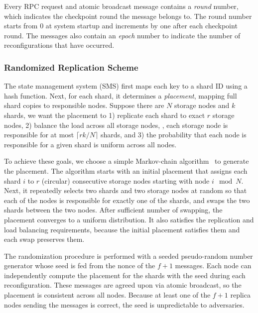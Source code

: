 Every RPC request and atomic broadcast message contains a \emph{round} number, which indicates the checkpoint round the message belongs to.
The round number starts from 0 at system startup and increments by one after each checkpoint round.
The \voter messages also contain an \emph{epoch} number to indicate the number of reconfigurations that have occurred.

\subsubsection{Randomized Replication Scheme}

The state management system (SMS) first maps each key to a shard ID using a hash function.
Next, for each shard, it determines a \emph{placement}, mapping full shard copies to responsible nodes.
Suppose there are $N$ storage nodes and $k$ shards, we want the placement to 1) replicate each shard to exact $r$ storage nodes, 2) balance the load across all storage nodes, \ie, each storage node is responsible for at most $\lceil rk/N \rceil$ shards, and 3) the probability that each node is responsible for a given shard is uniform across all nodes.

To achieve these goals, we choose a simple Markov-chain algorithm~\cite{kannan1999simple} to generate the placement.
The algorithm starts with an initial placement that assigns each shard $i$ to $r$ (circular) consecutive storage nodes starting with node $i \mod N$.
Next, it repeatedly selects two shards and two storage nodes at random so that each of the nodes is responsible for exactly one of the shards, and swaps the two shards between the two nodes.
After sufficient number of swapping, the placement converges to a uniform distribution.
It also satisfies the replication and load balancing requirements, because the initial placement satisfies them and each swap preserves them.

The randomization procedure is performed with a seeded pseudo-random number generator whose seed is fed from the nonce of the $f+1$ \voter messages.
Each node can independently compute the placement for the shards with the seed during each reconfiguration.
These \voter messages are agreed upon via atomic broadcast, so the placement is consistent across all nodes.
Because at least one of the $f+1$ replica nodes sending the \voter messages is correct, the seed is unpredictable to adversaries.

